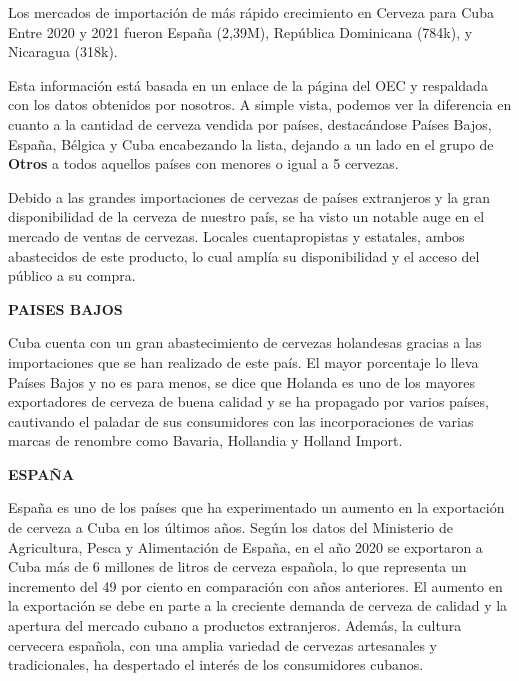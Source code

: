 \documentclass[a4paper,12pt]{article}
\begin{document}
Los mercados de importación de más rápido crecimiento en Cerveza para Cuba Entre 2020 y 2021 fueron España (2,39M), República Dominicana (784k), y Nicaragua (318k).

Esta información está basada en un enlace de la página del OEC y respaldada con los datos obtenidos por nosotros. A simple vista, podemos ver la diferencia en cuanto a la cantidad de cerveza vendida por países, destacándose Países Bajos, España, Bélgica y Cuba encabezando la lista, dejando a un lado en el grupo de \textbf{Otros} a todos aquellos países con menores o igual a 5 cervezas.

Debido a las grandes importaciones de cervezas de países extranjeros y la gran disponibilidad de la cerveza de nuestro país, se ha visto un notable auge en el mercado de ventas de cervezas. Locales cuentapropistas y estatales, ambos abastecidos de este producto, lo cual amplía su disponibilidad y el acceso del público a su compra.

\begin{center}
    \textbf{PAISES BAJOS}
\end{center}
Cuba cuenta con un gran abastecimiento de cervezas holandesas gracias a las importaciones que se han realizado de este país. 
El mayor porcentaje lo lleva Países Bajos y no es para menos, se dice que Holanda es uno de los mayores exportadores de cerveza de buena calidad y se ha propagado por varios países, cautivando el paladar de sus consumidores con las incorporaciones de varias marcas de renombre como Bavaria, Hollandia y Holland Import.

\begin{center}
    \textbf{ESPAÑA}
\end{center}
España es uno de los países que ha experimentado un aumento en la exportación de cerveza a Cuba en los últimos años. 
Según los datos del Ministerio de Agricultura, Pesca y Alimentación de España, en el año 2020 se exportaron a Cuba más de 6 millones de litros de cerveza española, lo que representa un incremento del 49 por ciento en comparación con años anteriores. 
El aumento en la exportación se debe en parte a la creciente demanda de cerveza de calidad y la apertura del mercado cubano a productos extranjeros. 
Además, la cultura cervecera española, con una amplia variedad de cervezas artesanales y tradicionales, ha despertado el interés de los consumidores cubanos.
\end{document}
